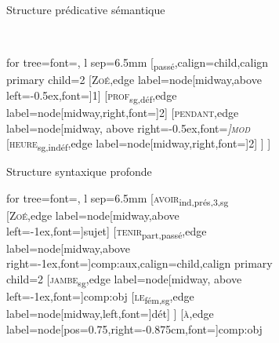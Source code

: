 \begin{figure}
\begin{subfigure}[h]{0.5\textwidth}
		\caption{Structure prédicative sémantique}
	\end{subfigure}%
	\bigskip\medskip\\%
	\begin{subfigure}[b]{0.5\textwidth}
		\begin{forest} for tree={font=\normalfont, l sep=6.5mm}
			[\textsubscript{passé},calign=child,calign primary child=2
				[\textsc{Zoé},edge label={node[midway,above left=-0.5ex,font=\footnotesize]{1}}]
				[\textsc{prof}\textsubscript{sg,déf},edge label={node[midway,right,font=\footnotesize]{2}}]
				[\textsc{pendant},edge label={node[midway, above right=-0.5ex,font=\footnotesize\itshape]{\textsc{mod}}}
					[\textsc{heure}\textsubscript{sg,indéf},edge label={node[midway,right,font=\footnotesize]{2}}]
				]
			]
		\end{forest}
		\caption{Structure syntaxique profonde}
	\end{subfigure}%
	\hfill
	\begin{subfigure}[b]{0.5\textwidth}
		\begin{forest} for tree={font=\normalfont, l sep=6.5mm}
			[\textsc{avoir}\textsubscript{ind,prés,3,sg}
				[\textsc{Zoé},edge label={node[midway,above left=-1ex,font=\footnotesize]{sujet}}]
				[\textsc{tenir}\textsubscript{part,passé},edge label={node[midway,above right=-1ex,font=\footnotesize]{comp{\NoAutoSpacing :}aux}},calign=child,calign primary child=2
					[\textsc{jambe}\textsubscript{sg},edge label={node[midway, above left=-1ex,font=\footnotesize]{comp{\NoAutoSpacing :}obj}}
						[\textsc{le}\textsubscript{fém,sg},edge label={node[midway,left,font=\footnotesize]{dét}}]
					]
					[\textsc{à},edge label={node[pos=0.75,right=-0.875cm,font=\footnotesize]{comp:obj}}

\end{forest}
\end{subfigure}
\end{figure}
